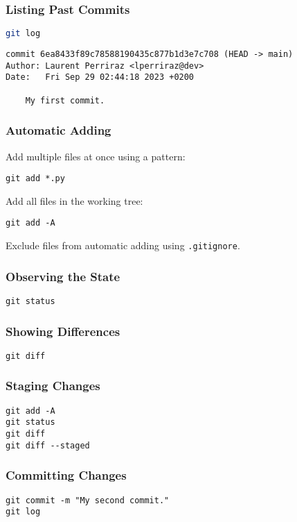 \documentclass[12pt]{article}
\begin{document}
\subsubsection{Listing Past Commits}
\begin{lstlisting}[language=bash]
git log
\end{lstlisting}
\begin{verbatim}
commit 6ea8433f89c78588190435c877b1d3e7c708 (HEAD -> main)
Author: Laurent Perriraz <lperriraz@dev>
Date:   Fri Sep 29 02:44:18 2023 +0200

    My first commit.
\end{verbatim}

\subsubsection{Automatic Adding}
Add multiple files at once using a pattern:
\begin{lstlisting}
git add *.py
\end{lstlisting}
    
Add all files in the working tree:
\begin{lstlisting}
git add -A
\end{lstlisting}
    
Exclude files from automatic adding using \texttt{.gitignore}.

\subsubsection{Observing the State}
\begin{lstlisting}
git status
\end{lstlisting}

\subsubsection{Showing Differences}
\begin{lstlisting}
git diff
\end{lstlisting}

\subsubsection{Staging Changes}
\begin{lstlisting}
git add -A
git status
git diff
git diff --staged
\end{lstlisting}

\subsubsection{Committing Changes}
\begin{lstlisting}
git commit -m "My second commit."
git log
\end{lstlisting}
\end{document}
